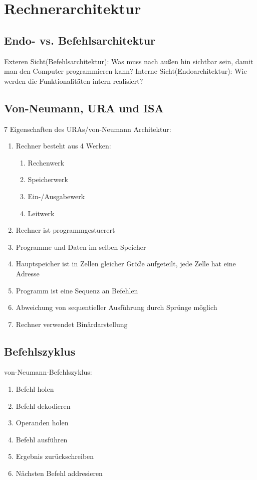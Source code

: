 \section{Rechnerarchitektur}
	\subsection{Endo- vs. Befehlsarchitektur}
		Exteren Sicht(Befehlsarchitektur): Was muss nach außen hin sichtbar sein, damit man den Computer programmieren kann? \newline \newline
		Interne Sicht(Endoarchitektur): Wie werden die Funktionalitäten intern realisiert?
	\subsection{Von-Neumann, URA und ISA}
		7 Eigenschaften des URAs/von-Neumann Architektur:
		\begin{enumerate}
			\item Rechner besteht aus 4 Werken:
				\begin{enumerate}
					\item Rechenwerk
					\item Speicherwerk
					\item Ein-/Ausgabewerk
					\item Leitwerk
				\end{enumerate}
			\item Rechner ist programmgestuerert
			\item Programme und Daten im selben Speicher
			\item Hauptspeicher ist in Zellen gleicher Größe aufgeteilt, jede Zelle hat eine Adresse
			\item Programm ist eine Sequenz an Befehlen
			\item Abweichung von sequentieller Ausführung durch Sprünge möglich
			\item Rechner verwendet Binärdarstellung
		\end{enumerate}
	\subsection{Befehlszyklus}
		von-Neumann-Befehlszyklus:
		\begin{enumerate}
			\item Befehl holen
			\item Befehl dekodieren
			\item Operanden holen
			\item Befehl ausführen
			\item Ergebnis zurückschreiben
			\item Nächsten Befehl addresieren
		\end{enumerate}
